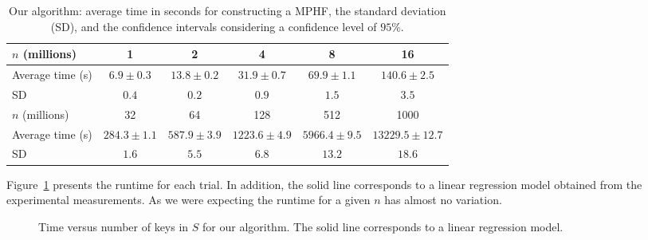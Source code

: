\enlargethispage{2\baselineskip}
\begin{table*}[htb]
\vspace{-1mm}
\begin{center}
{\scriptsize
\begin{tabular}{|l|c|c|c|c|c|}
\hline
$n$ (millions)   & 1                  & 2                  & 4                  & 8                   & 16             \\
\hline %
Average time (s) & $6.9 \pm 0.3$  & $13.8 \pm 0.2$ & $31.9 \pm 0.7$ & $69.9 \pm 1.1$  & $140.6 \pm 2.5$  \\
SD               & $0.4$            & $0.2$            & $0.9$            & $1.5$             & $3.5$         \\
\hline
\hline
$n$ (millions)   & 32                  & 64                   & 128                    & 512                  & 1000            \\
\hline %
Average time (s) & $284.3 \pm 1.1$ & $587.9 \pm 3.9$  & $1223.6 \pm 4.9$   & $5966.4 \pm 9.5$ & $13229.5 \pm 12.7$  \\
SD               & $1.6$             & $5.5$              & $6.8$                & $13.2$             & $18.6$            \\
\hline

\end{tabular}
\vspace{-1mm}
}
\end{center}
\caption{Our algorithm: average time in seconds for constructing a MPHF,
the standard deviation (SD), and the confidence intervals considering 
a confidence level of $95\%$.
}
\label{tab:mediasbrz}
\vspace{-5mm}
\end{table*}

Figure~\ref{fig:brz_temporegressao}
presents the runtime for each trial. In addition, 
the solid line corresponds to a linear regression model 
obtained from the experimental measurements.
As we were expecting the runtime for a given $n$ has almost no 
variation.

\begin{figure}[htb]
\begin{center}
\caption{Time versus number of keys in $S$ for our algorithm. The solid line corresponds to 
a linear regression model.}
\label{fig:brz_temporegressao}
\end{center}
\vspace{-9mm}
\end{figure}

